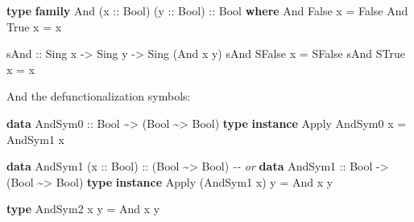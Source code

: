 \documentclass[]{article}
\newenvironment{Shaded}{}{}
\newcommand{\CommentTok}[1]{\textcolor[rgb]{0.38,0.63,0.69}{\textit{#1}}}
\newcommand{\DataTypeTok}[1]{\textcolor[rgb]{0.56,0.13,0.00}{#1}}
\newcommand{\KeywordTok}[1]{\textcolor[rgb]{0.00,0.44,0.13}{\textbf{#1}}}
\newcommand{\NormalTok}[1]{#1}
\newcommand{\OperatorTok}[1]{\textcolor[rgb]{0.40,0.40,0.40}{#1}}
\newcommand{\OtherTok}[1]{\textcolor[rgb]{0.00,0.44,0.13}{#1}}
\begin{document}
\begin{Shaded}
\begin{Highlighting}[]
\KeywordTok{type} \KeywordTok{family} \DataTypeTok{And}\NormalTok{ (}\OtherTok{x ::} \DataTypeTok{Bool}\NormalTok{) (}\OtherTok{y ::} \DataTypeTok{Bool}\NormalTok{)}\OtherTok{ ::} \DataTypeTok{Bool} \KeywordTok{where}
    \DataTypeTok{And} \DataTypeTok{\textquotesingle{}False}\NormalTok{ x }\OtherTok{=} \DataTypeTok{\textquotesingle{}False}
    \DataTypeTok{And} \DataTypeTok{\textquotesingle{}True}\NormalTok{  x }\OtherTok{=}\NormalTok{ x}

\OtherTok{sAnd ::} \DataTypeTok{Sing}\NormalTok{ x }\OtherTok{{-}\textgreater{}} \DataTypeTok{Sing}\NormalTok{ y }\OtherTok{{-}\textgreater{}} \DataTypeTok{Sing}\NormalTok{ (}\DataTypeTok{And}\NormalTok{ x y)}
\NormalTok{sAnd }\DataTypeTok{SFalse}\NormalTok{ x }\OtherTok{=} \DataTypeTok{SFalse}
\NormalTok{sAnd }\DataTypeTok{STrue}\NormalTok{  x }\OtherTok{=}\NormalTok{ x}
\end{Highlighting}
\end{Shaded}

And the defunctionalization symbols:

\begin{Shaded}
\begin{Highlighting}[]
\KeywordTok{data} \DataTypeTok{AndSym0}\OtherTok{ ::} \DataTypeTok{Bool} \OperatorTok{\textasciitilde{}\textgreater{}}\NormalTok{ (}\DataTypeTok{Bool} \OperatorTok{\textasciitilde{}\textgreater{}} \DataTypeTok{Bool}\NormalTok{)}
\KeywordTok{type} \KeywordTok{instance} \DataTypeTok{Apply} \DataTypeTok{AndSym0}\NormalTok{ x }\OtherTok{=} \DataTypeTok{AndSym1}\NormalTok{ x}

\KeywordTok{data} \DataTypeTok{AndSym1}\NormalTok{ (}\OtherTok{x ::} \DataTypeTok{Bool}\NormalTok{)}\OtherTok{ ::}\NormalTok{ (}\DataTypeTok{Bool} \OperatorTok{\textasciitilde{}\textgreater{}} \DataTypeTok{Bool}\NormalTok{)}
\CommentTok{{-}{-} or}
\KeywordTok{data} \DataTypeTok{AndSym1}\OtherTok{ ::} \DataTypeTok{Bool} \OtherTok{{-}\textgreater{}}\NormalTok{ (}\DataTypeTok{Bool} \OperatorTok{\textasciitilde{}\textgreater{}} \DataTypeTok{Bool}\NormalTok{)}
\KeywordTok{type} \KeywordTok{instance} \DataTypeTok{Apply}\NormalTok{ (}\DataTypeTok{AndSym1}\NormalTok{ x) y }\OtherTok{=} \DataTypeTok{And}\NormalTok{ x y}

\KeywordTok{type} \DataTypeTok{AndSym2}\NormalTok{ x y }\OtherTok{=} \DataTypeTok{And}\NormalTok{ x y}
\end{Highlighting}
\end{Shaded}
\end{document}
